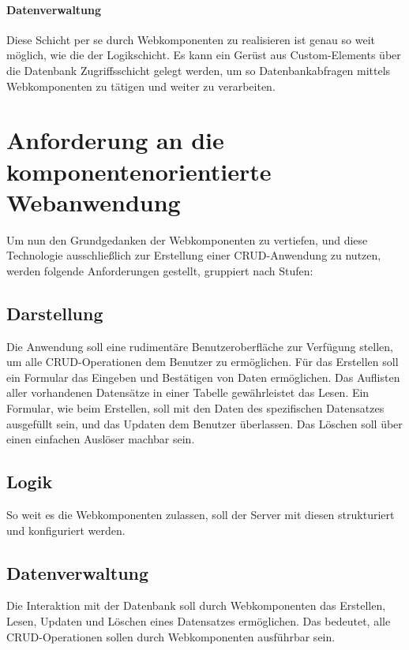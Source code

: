 \paragraph{Datenverwaltung}Diese Schicht per se durch Webkomponenten zu realisieren ist genau so weit möglich, wie die der Logikschicht. Es kann ein Gerüst aus Custom-Elements über die Datenbank Zugriffsschicht gelegt werden, um so Datenbankabfragen mittels Webkomponenten zu tätigen und weiter zu verarbeiten. 


\section{Anforderung an die komponentenorientierte Webanwendung}
Um nun den Grundgedanken der Webkomponenten zu vertiefen, und diese Technologie ausschließlich zur Erstellung einer CRUD-Anwendung zu nutzen, werden folgende Anforderungen gestellt, gruppiert nach Stufen:

\subsection{Darstellung}
Die Anwendung soll eine rudimentäre Benutzeroberfläche zur Verfügung stellen, um alle CRUD-Operationen dem Benutzer zu ermöglichen. 
Für das Erstellen soll ein Formular das Eingeben und Bestätigen von Daten ermöglichen.
Das Auflisten aller vorhandenen Datensätze in einer Tabelle gewährleistet das Lesen.
Ein Formular, wie beim Erstellen, soll mit den Daten des spezifischen Datensatzes ausgefüllt sein, und das Updaten dem Benutzer überlassen.
Das Löschen soll über einen einfachen Auslöser machbar sein.
\subsection{Logik}
So weit es die Webkomponenten zulassen, soll der Server mit diesen strukturiert und konfiguriert werden.

\subsection{Datenverwaltung}
Die Interaktion mit der Datenbank soll durch Webkomponenten das Erstellen, Lesen, Updaten und Löschen eines Datensatzes ermöglichen. Das bedeutet, alle CRUD-Operationen sollen durch Webkomponenten ausführbar sein. 

